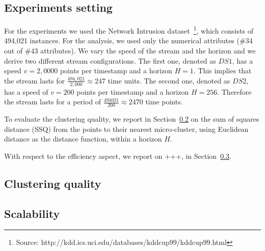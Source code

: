 \subsection{Experiments setting}
For the experiments we used the Network Intrusion dataset~\footnote{Source: http://kdd.ics.uci.edu/databases/kddcup99/kddcup99.html}, which consists of 494,021 instances. For the analysis, we used only the numerical attributes (\#34 out of \#43 attributes).
We vary the speed of the stream and the horizon and we derive two different stream configurations.
The first one, denoted as $DS1$, has a speed $v=2,0000$ points per timestamp and a horizon $H=1$. This implies that the stream lasts for $\frac{494,021}{2,000} \approx 247$ time units. 
The second one, denoted as $DS2$, has a speed of $v=200$ points per timestamp and a horizon $H=256$. Therefore the stream lasts for a period of $\frac{494021}{200} \approx 2470$ time points.

To evaluate the clustering quality, we report in Section~\ref{sec:expQuality} on the sum of squares distance (SSQ) from the points to their nearest micro-cluster, using Euclidean distance as the distance function, within a horizon $H$.

With respect to the efficiency aspect, we report on \color{red}+++\color{black}, in Section~\ref{sec:expScalability}. 

\subsection{Clustering quality}
\label{sec:expQuality}



\subsection{Scalability}
\label{sec:expScalability}
